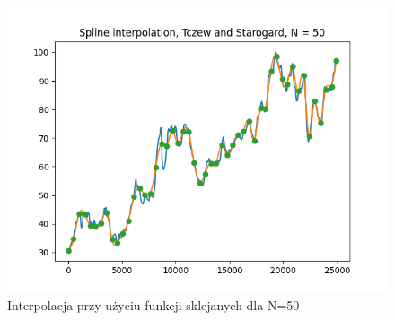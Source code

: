 \documentclass{article}
\begin{document}
\begin{itemize}
\begin{figure}[!htb]
      \includegraphics[width=\linewidth]{Tczew_and_Starogard_splines_N_50.png}
      \caption{Interpolacja przy użyciu funkcji sklejanych dla N=50}
    \endminipage\hfill
    \end{figure}
    

\end{itemize}
\end{document}

